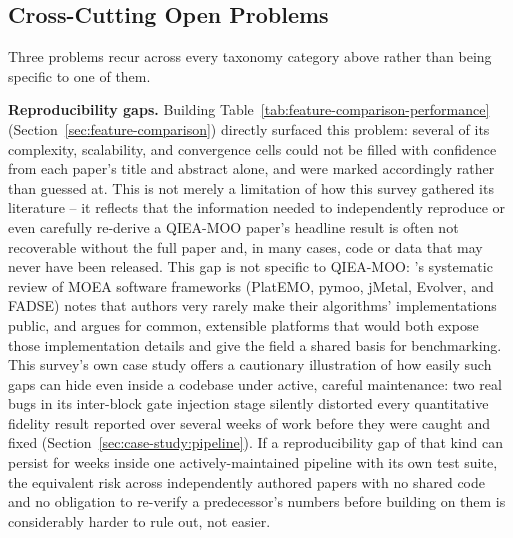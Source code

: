 \subsection{Cross-Cutting Open Problems}
\label{sec:critical-analysis:cross-cutting}

Three problems recur across every taxonomy category above rather than
being specific to one of them.

\textbf{Reproducibility gaps.} Building
Table~\ref{tab:feature-comparison-performance}
(Section~\ref{sec:feature-comparison}) directly surfaced this problem:
several of its complexity, scalability, and convergence cells could not
be filled with confidence from each paper's title and abstract alone,
and were marked accordingly rather than guessed at. This is not merely
a limitation of how this survey gathered its literature -- it reflects
that the information needed to independently reproduce or even
carefully re-derive a QIEA-MOO paper's headline result is often not
recoverable without the full paper and, in many cases, code or data
that may never have been released. This gap is not specific to
QIEA-MOO: \citet{patrausanu2024frameworks}'s systematic review of MOEA
software frameworks (PlatEMO, pymoo, jMetal, Evolver, and FADSE) notes
that authors very rarely make their algorithms' implementations public,
and argues for common, extensible platforms that would both expose those
implementation details and give the field a shared basis for
benchmarking. This survey's own case study offers
a cautionary illustration of how easily such gaps can hide even inside
a codebase under active, careful maintenance: two real bugs in its
inter-block gate injection stage silently distorted every quantitative
fidelity result reported over several weeks of work before they were
caught and fixed (Section~\ref{sec:case-study:pipeline}). If a
reproducibility gap of
that kind can persist for weeks inside one actively-maintained pipeline
with its own test suite, the equivalent risk across independently
authored papers with no shared code and no obligation to re-verify a
predecessor's numbers before building on them is considerably harder to
rule out, not easier.

